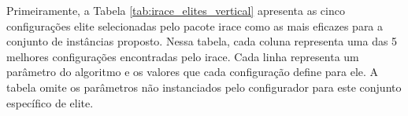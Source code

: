 Primeiramente, a Tabela \ref{tab:irace_elites_vertical} apresenta as cinco configurações elite selecionadas pelo pacote irace como as mais eficazes para a conjunto de instâncias proposto. Nessa tabela, cada coluna representa uma das 5 melhores configurações encontradas pelo irace. Cada linha representa um parâmetro do algoritmo e os valores que cada configuração define para ele. A tabela omite os parâmetros não instanciados pelo configurador para este conjunto específico de elite.

\begin{table}[ht]
\centering
\caption{Configurações Elite Finais}
\label{tab:irace_elites_vertical}
\end{table}
